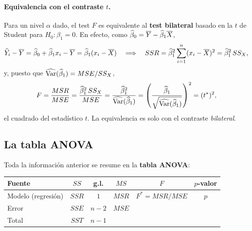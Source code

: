 \paragraph{Equivalencia con el contraste $t$.} Para un nivel $\alpha$ dado, el test $F$ es
equivalente al \textbf{test bilateral} basado en la $t$ de Student para $H_0\colon\beta_1=0$. En
efecto, como $\widehat{\beta}_0=\overline{Y}-\widehat{\beta}_1\overline{X}$,
\[
  \widehat{Y}_i-\overline{Y} = \widehat{\beta}_0+\widehat{\beta}_1x_i-\overline{Y} = \widehat{\beta}_1(x_i-\overline{X})
  \quad\Longrightarrow\quad
  SSR = \widehat{\beta}_1^2\sum_{i=1}^{n} (x_i-\overline{X})^2 = \widehat{\beta}_1^2\,SS_X ,
\]
y, puesto que $\widehat{\operatorname{Var}}(\widehat{\beta}_1)=MSE/SS_X$,
\[
  F = \frac{MSR}{MSE} = \frac{\widehat{\beta}_1^2\,SS_X}{MSE}
  = \frac{\widehat{\beta}_1^2}{\widehat{\operatorname{Var}}(\widehat{\beta}_1)}
  = \left(\frac{\widehat{\beta}_1}{\sqrt{\widehat{\operatorname{Var}}(\widehat{\beta}_1)}}\right)^2 = (t^*)^2 ,
\]
el cuadrado del estadístico $t$. La equivalencia es solo con el contraste \emph{bilateral}.

\subsection{La tabla ANOVA}

Toda la información anterior se resume en la \textbf{tabla ANOVA}:
\begin{center}
  \renewcommand{\arraystretch}{1.3}
  \begin{tabular}{lccccc}
    \toprule
    Fuente & $SS$ & g.l. & $MS$ & $F$ & $p$-valor \\
    \midrule
    Modelo (regresión) & $SSR$ & $1$ & $MSR$ & $F^*=MSR/MSE$ & $p$ \\
    Error & $SSE$ & $n-2$ & $MSE$ & & \\
    Total & $SST$ & $n-1$ & & & \\
    \bottomrule
  \end{tabular}
\end{center}

